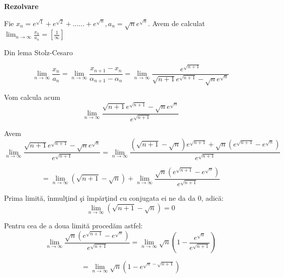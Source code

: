 \documentclass[a4paper,12pt,oneside]{report}
\begin{document}
\begin{enumerate}
\textbf{Rezolvare}

Fie \( x_{n} = e^{\sqrt{1}}+ e^{\sqrt{2}}+......+e^{\sqrt{n}}, a_{n}= \sqrt{n}e^{\sqrt{n}}.\) Avem de calculat \(\lim_{n \to \infty }\frac{x_{n}}{a_{n}}= \left [ \frac{1}{\infty } \right ]\)


Din lema Stolz-Cesaro 


\begin{displaymath}
  \lim_{n \to \infty }\frac{x_{n}}{a_{n}}= \lim_{n \to \infty }\frac{x_{n+1}-x_{n}}{\alpha _{n+1}-\alpha _{n}}=\lim_{n \to \infty }\frac{e^{\sqrt{n+1}}}{\sqrt{n+1}e^{\sqrt{n+1}}-\sqrt{n}e^{\sqrt{n}}}
\end{displaymath}


Vom calcula acum 
\begin{displaymath}
  \lim_{n \to \infty }\frac{\sqrt{n+1}e^{\sqrt{n+1}}-\sqrt{n}e^{\sqrt{n}}}{e^{\sqrt{n+1}}}
\end{displaymath}


Avem 
\begin{displaymath}
  \lim_{n \to \infty }\frac{\sqrt{n+1}e^{\sqrt{n+1}}-\sqrt{n}e^{\sqrt{n}}}{e^{\sqrt{n+1}}} = \lim_{n \to \infty }\frac{\left ( \sqrt{n+1}-\sqrt{n} \right )e^{\sqrt{n+1}}+ \sqrt{n}\left ( e^{\sqrt{n+1}}-e^{\sqrt{n}} \right )}{e^{\sqrt{n+1}}}
\end{displaymath}

\begin{displaymath}
  = \lim_{n \to \infty }\left ( \sqrt{n+1}-\sqrt{n} \right )+ \lim_{n \to \infty }\frac{\sqrt{n}\left ( e^{\sqrt{n+1}} -e^{\sqrt{n}} \right )}{e^{\sqrt{n+1}}} 
\end{displaymath}


Prima limit\u a, \^ inmul\c tind \c si \^ imp\u ar\c tind cu conjugata ei ne da da 0, adic\u a:
\begin{displaymath}
  \lim_{n \to \infty }\left ( \sqrt{n+1}-\sqrt{n} \right ) = 0
\end{displaymath}


Pentru cea de a doua limit\u a proced\u am astfel:
\begin{displaymath}
  \lim_{n \to \infty }\frac{\sqrt{n}\left ( e^{\sqrt{n+1}} -e^{\sqrt{n}} \right )}{e^{\sqrt{n+1}}}  = \lim_{n \to \infty } \sqrt{n}\left ( 1- \frac{e^{\sqrt{n}}}{e^{\sqrt{n+1}}} \right )
\end{displaymath}

\begin{displaymath}
  =\lim_{n \to \infty }\sqrt{n}\left ( 1-e^{\sqrt{n}-\sqrt{n+1}} \right )
\end{displaymath}


\end{enumerate}
\end{document}
